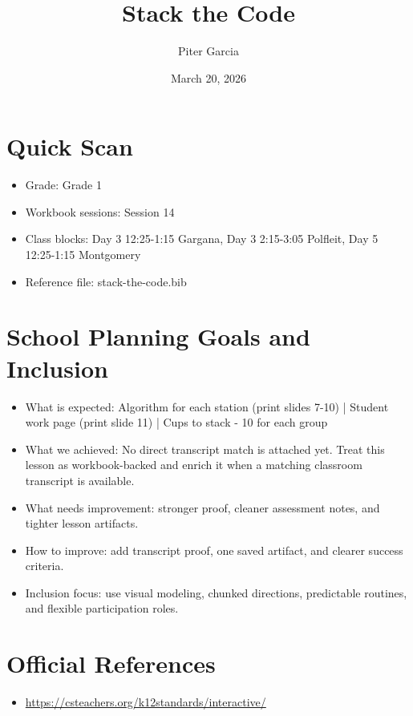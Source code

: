 \documentclass[11pt]{article}
\title{Stack the Code}
\author{Piter Garcia}
\date{March 20, 2026}
\begin{document}
\maketitle
\section*{Quick Scan}
\begin{itemize}[leftmargin=*]
\item Grade: Grade 1
\item Workbook sessions: Session 14
\item Class blocks: Day 3 12:25-1:15 Gargana, Day 3 2:15-3:05 Polfleit, Day 5 12:25-1:15 Montgomery
\item Reference file: stack-the-code.bib
\end{itemize}
\section*{School Planning Goals and Inclusion}
\begin{itemize}[leftmargin=*]
\item What is expected: Algorithm for each station (print slides 7-10) | Student work page (print slide 11) | Cups to stack - 10 for each group
\item What we achieved: No direct transcript match is attached yet. Treat this lesson as workbook-backed and enrich it when a matching classroom transcript is available.
\item What needs improvement: stronger proof, cleaner assessment notes, and tighter lesson artifacts.
\item How to improve: add transcript proof, one saved artifact, and clearer success criteria.
\item Inclusion focus: use visual modeling, chunked directions, predictable routines, and flexible participation roles.
\end{itemize}
\section*{Official References}
\begin{itemize}[leftmargin=*]
\item \url{https://csteachers.org/k12standards/interactive/}

\end{itemize}
\end{document}
